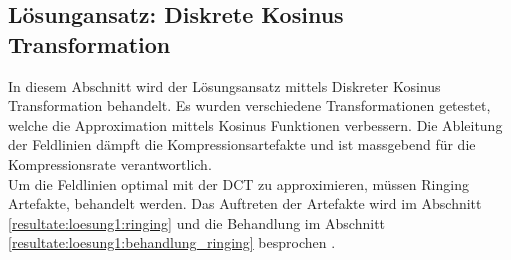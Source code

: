 \subsection{Lösungansatz: Diskrete Kosinus Transformation}
In diesem Abschnitt wird der Lösungsansatz mittels Diskreter Kosinus Transformation behandelt. Es wurden verschiedene Transformationen getestet, welche die Approximation mittels Kosinus Funktionen verbessern. Die Ableitung der Feldlinien dämpft die Kompressionsartefakte und ist massgebend für die Kompressionsrate verantwortlich.\\
Um die Feldlinien optimal mit der DCT zu approximieren, müssen Ringing Artefakte, behandelt werden. Das Auftreten der Artefakte wird im Abschnitt \ref{resultate:loesung1:ringing} und die Behandlung im Abschnitt \ref{resultate:loesung1:behandlung_ringing} besprochen .

